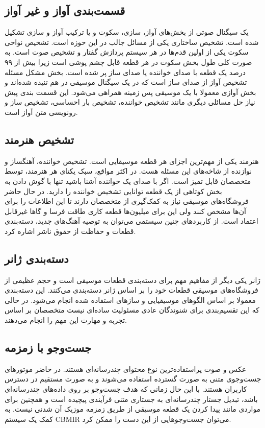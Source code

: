 \subsection{قسمت‌بندی آواز و غیر آواز}
یک سیگنال صوتی از بخش‌های آواز، سازی، سکوت و یا ترکیب آواز و سازی تشکیل شده است.
تشخیص ساختاری یکی از مسائل جالب در این حوزه است. تشخیص نواحی سکوت یکی از اولین
قدم‌ها در هر سیستم پردازش گفتار و تشخیص صوت است. به صورت کلی طول بخش سکوت در هر
قطعه قابل چشم پوشی است زیرا بیش از ۹۹ درصد یک قطعه با صدای خواننده یا صدای ساز
پر شده است. بخش مشکل مسئله تشخیص آواز از صدای ساز است که در یک سیگنال موسیقی در
هم تنیده شده‌اند و بخش آوازی معمولا با یک موسیقی پس زمینه همراهی می‌شود. این
قسمت بندی پیش نیاز حل مسائلی دیگری مانند تشخیص خواننده، تشخیص بار احساسی، تشخیص
ساز و رونویسی متن آواز است.

\subsection{تشخیص هنرمند}
هنرمند یکی از مهم‌ترین اجزای هر قطعه موسیقایی است. تشخیص خواننده، آهنگساز و
نوازنده از شاخه‌های این مسئله هست. در اکثر مواقع، سبک یکتای هر هنرمند، توسط
متخصصان قابل تمیز است. اگر با صدای یک خواننده آشنا باشید تنها با گوش دادن به بخش
کوتاهی از یک قطعه توانایی تشخیص خواننده را دارید. در حال حاضر فروشگاه‌های موسیقی
نیاز به کمک‌گیری از متخصصان دارند تا این اطلاعات را برای آن‌ها مشخص کنند ولی این
برای میلیون‌ها قطعه کاری طاقت فرسا و گاها غیرقابل اعتماد است. از کاربردهای چنین
سیستمی می‌توان به توصیه آهنگ‌های جدید، دسته‌بندی قطعات و حفاظت از حقوق ناشر
اشاره کرد.

\subsection{دسته‌بندی ژانر}
ژانر یکی دیگر از مفاهیم مهم برای دسته‌بندی قطعات موسیقی است و حجم عظیمی از
فروشگاه‌های موسیقی قطعات خود را بر اساس ژانر دسته‌بندی می‌کنند. این دسته‌بندی
معمولا بر اساس الگوهای موسیقیایی و سازهای استفاده شده انجام می‌شود. در حالی که
این تقسیم‌بندی برای شنوندگان عادی مسئولیت ساده‌ای نیست متخصصان بر اساس تجربه و
مهارت این مهم را انجام می‌دهند.

\subsection{جست‌وجو با زمزمه}
عکس و صوت پراستفاده‌ترین نوع محتوای چندرسانه‌ای هستند. در حاضر موتورهای جست‌وجوی
متنی به صورت گسترده استفاده می‌شوند و به صورت مستقیم در دسترس کاربران هستند. با
این حال زمانی که هدف جست‌وجو بر روی داده‌های چندرسانه‌ای باشد، تبدیل جستار
چندرسانه‌ای به جستاری متنی فرآیندی پیچیده است و همچنین برای مواردی مانند پیدا
کردن یک قطعه موسیقی از طریق زمزمه موزیک آن شدنی نیست. به کمک یک سیستم
\gls{CBMIR} می‌توان جست‌وجوهایی از این دست را ممکن کرد.

